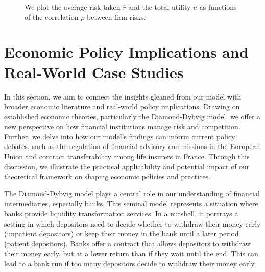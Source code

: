 \documentclass[preprint,12pt,authoryear]{elsarticle}
\theoremstyle{definition}
\begin{document}
\begin{figure}[htbp]
  \centering
  \begin{minipage}[t]{0.48\textwidth}
    \centering
    
  \end{minipage}
  \hfill
  \begin{minipage}[t]{0.48\textwidth}
    \centering
    
  \end{minipage}
  \begin{minipage}[t]{0.48\textwidth}
    \centering
    
  \end{minipage}
  \hfill
  \begin{minipage}[t]{0.48\textwidth}
    \centering
    
  \end{minipage}
  \caption{We plot the average risk taken $\bar r$ and the total utility $u$ as functions of the correlation $\rho$ between firm risks.}
  \label{fig:result-corr}  
\end{figure}


\section{Economic Policy Implications and Real-World Case Studies}

In this section, we aim to connect the insights gleaned from our model with broader economic literature and real-world policy implications. Drawing on established economic theories, particularly the Diamond-Dybvig model, we offer a new perspective on how financial institutions manage risk and competition. Further, we delve into how our model's findings can inform current policy debates, such as the regulation of financial advisory commissions in the European Union and contract transferability among life insurers in France. Through this discussion, we illustrate the practical applicability and potential impact of our theoretical framework on shaping economic policies and practices.

The Diamond-Dybvig model \citep{diamond1983bank} plays a central role in our understanding of financial intermediaries, especially banks. This seminal model represents a situation where banks provide liquidity transformation services. In a nutshell, it portrays a setting in which depositors need to decide whether to withdraw their money early (impatient depositors) or keep their money in the bank until a later period (patient depositors). Banks offer a contract that allows depositors to withdraw their money early, but at a lower return than if they wait until the end. This can lead to a bank run if too many depositors decide to withdraw their money early.
\end{document}
